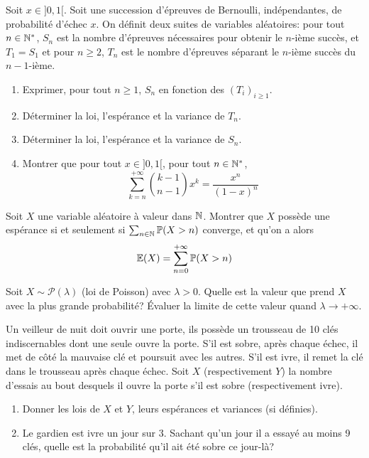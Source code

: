 \begin{exercise}
	Soit $x\in]0,1[$. Soit une succession d'épreuves de Bernoulli, indépendantes,
	de probabilité d'échec $x$. On définit deux suites de variables aléatoires:
	pour tout $n\in\mathbb{N}^{*}$, $S_{n}$ est la nombre d'épreuves nécessaires pour
	obtenir le $n$-ième succès, et $T_{1}=S_{1}$ et pour $n\geqslant2$, $T_{n}$
	est le nombre d'épreuves séparant le $n$-ième succès du $n-1$-ième.
	\begin{enumerate}
		\item
		Exprimer, pour tout $n\geqslant1$, $S_{n}$ en fonction des
		$(T_{i})_{i\geqslant1}$.
		\item
		Déterminer la loi, l'espérance et la variance de $T_{n}$.
		\item
		Déterminer la loi, l'espérance et la variance de $S_{n}$.
		\item
		Montrer que pour tout $x\in]0,1[$, pour tout $n\in\mathbb{N}^{*}$,
		$$\sum_{k=n}^{+\infty}\binom{k-1}{n-1}x^{k}=\frac{x^{n}}{(1-x)^{n}}$$
	\end{enumerate}
\end{exercise}

\begin{exercise}
Soit $X$ une variable aléatoire à valeur dans $\mathbb{N}$. Montrer que $X$ possède une
espérance si et seulement si $\sum_{n\in\mathbb{N}}\mathbb{P}(X>n)$ converge, et qu'on a alors
$$\mathbb{E}(X)=\sum_{n=0}^{+\infty}\mathbb{P}(X>n)$$
\end{exercise}

\begin{exercise}
	Soit $X\sim\mathcal{P}(\lambda)$ (loi de Poisson) avec $\lambda>0$. Quelle est
	la valeur que prend $X$ avec la plus grande probabilité? Évaluer la limite de
	cette valeur quand $\lambda\to+\infty$.
\end{exercise}

\begin{exercise}
	Un veilleur de nuit doit ouvrir une porte, ils possède un trousseau de 10 clés
	indiscernables dont une seule ouvre la porte. S'il est sobre, après chaque
	échec, il met de côté la mauvaise clé et poursuit avec les autres. S'il est
	ivre, il remet la clé dans le trousseau après chaque échec. Soit $X$
	(respectivement $Y$) la nombre d'essais au bout desquels il ouvre la porte
	s'il est sobre (respectivement ivre).
	\begin{enumerate}
		\item
		Donner les lois de $X$ et $Y$, leurs espérances et variances (si
		définies).
		\item
		Le gardien est ivre un jour sur 3. Sachant qu'un jour il a essayé au moins
		9 clés, quelle est la probabilité qu'il ait été sobre ce jour-là?
	\end{enumerate}
\end{exercise}


